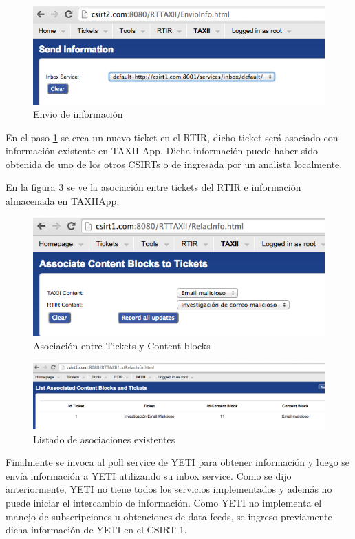 \begin{figure}[H]
	\centering
	\includegraphics[scale=0.4]{caso-de-estudio/envioInfo.png}
	\caption{Envio de información}
	\label{fig.envioInfo}
\end{figure}

En el paso \ref{fig.envioInfo} se crea un nuevo ticket en el RTIR, dicho ticket será asociado con información existente en TAXII App. Dicha información puede haber sido obtenida de uno de los otros CSIRTs o de ingresada por un analista localmente.

En la figura \ref{fig.lstRelacInfo} se ve la asociación entre tickets del RTIR e información almacenada en TAXIIApp.

\begin{figure}[H]
	\centering
	\includegraphics[scale=0.4]{caso-de-estudio/relacInfo.png}
	\caption{Asociación entre Tickets y Content blocks}
	\label{fig.relacInfo}
\end{figure}

\begin{figure}[H]
	\centering
	\includegraphics[scale=0.4]{caso-de-estudio/lstRelacInfo.png}
	\caption{Listado de asociaciones existentes}
	\label{fig.lstRelacInfo}
\end{figure}

Finalmente se invoca al poll service de YETI para obtener información y luego se envía información a YETI utilizando su inbox service. Como se dijo anteriormente, YETI no tiene todos los servicios implementados y además no puede iniciar el intercambio de información. Como YETI  no implementa el manejo de subscripciones u obtenciones de data feeds, se ingreso previamente dicha información de YETI en el CSIRT 1.
